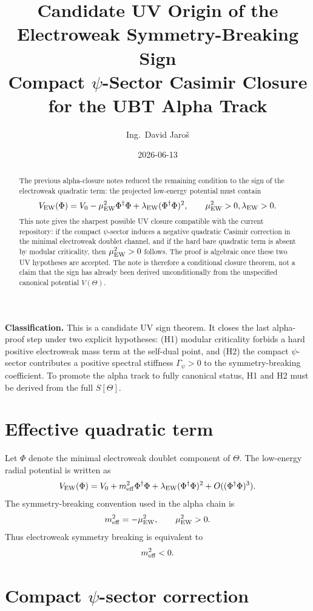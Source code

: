 \documentclass[12pt,a4paper]{article}
\title{Candidate UV Origin of the Electroweak Symmetry-Breaking Sign\\
       \large Compact $\psi$-Sector Casimir Closure for the UBT Alpha Track}
\author{Ing.\ David Jaro\v{s}}
\date{2026-06-13}
\begin{document}
\maketitle
\fi

\begin{abstract}
The previous alpha-closure notes reduced the remaining condition to the sign of
the electroweak quadratic term: the projected low-energy potential must contain
\[
  V_{\rm EW}(\Phi)
  =V_0-\mu_{\rm EW}^2\Phi^\dagger\Phi
  +\lambda_{\rm EW}(\Phi^\dagger\Phi)^2,
  \qquad
  \mu_{\rm EW}^2>0,
  \lambda_{\rm EW}>0.
\]
This note gives the sharpest possible UV closure compatible with the current
repository: if the compact $\psi$-sector induces a negative quadratic Casimir
correction in the minimal electroweak doublet channel, and if the hard bare
quadratic term is absent by modular criticality, then $\mu_{\rm EW}^2>0$ follows.
The proof is algebraic once these two UV hypotheses are accepted.  The note is
therefore a conditional closure theorem, not a claim that the sign has already
been derived unconditionally from the unspecified canonical potential
$V(\Theta)$.
\end{abstract}

\begin{statusbox}
\textbf{Classification.} This is a candidate UV sign theorem.  It closes the
last alpha-proof step under two explicit hypotheses: (H1) modular criticality
forbids a hard positive electroweak mass term at the self-dual point, and (H2)
the compact $\psi$-sector contributes a positive spectral stiffness
$\Gamma_{\psi}>0$ to the symmetry-breaking coefficient.  To promote the alpha
track to fully canonical status, H1 and H2 must be derived from the full
$S[\Theta]$.
\end{statusbox}

\section{Effective quadratic term}

Let $\Phi$ denote the minimal electroweak doublet component of $\Theta$.  The
low-energy radial potential is written as
\[
  V_{\rm EW}(\Phi)
  =V_0+m_{\rm eff}^2\Phi^\dagger\Phi
  +\lambda_{\rm EW}(\Phi^\dagger\Phi)^2+
  O((\Phi^\dagger\Phi)^3).
\]
The symmetry-breaking convention used in the alpha chain is
\[
  m_{\rm eff}^2=-\mu_{\rm EW}^2,
  \qquad
  \mu_{\rm EW}^2>0.
\]
Thus electroweak symmetry breaking is equivalent to
\[
  m_{\rm eff}^2<0.
\]

\section{Compact $\psi$-sector correction}
\end{document}
